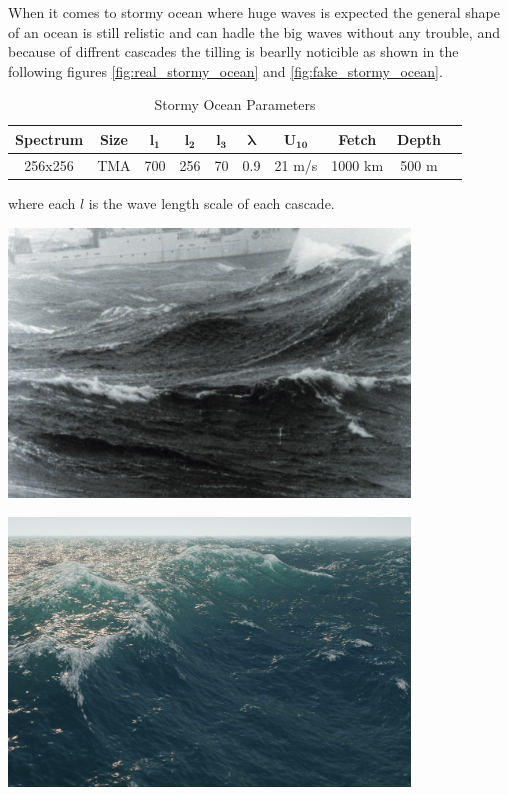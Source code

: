 When it comes to stormy ocean where huge waves is expected the general shape of an ocean is still relistic
and can hadle the big waves without any trouble, and because of diffrent cascades the tilling is bearlly noticible as shown in the following figures \ref{fig:real_stormy_ocean} and \ref{fig:fake_stormy_ocean}.
\begin{table}[h]
    \centering
    \begin{tabular}{|c|c|c|c|c|c|c|c|c|c|}
        \hline
        \textbf{Spectrum} & \textbf{Size} & $\mathbf{l_1}$ & $\mathbf{l_2}$ & $\mathbf{l_3}$ & $\mathbf{\lambda}$ & $\mathbf{U_{10}}$ & \textbf{Fetch} & \textbf{Depth} \\
        \hline
        256x256 & TMA & 700 & 256 & 70 & 0.9 & 21 m/s & 1000 km & 500 m \\
        \hline
    \end{tabular}
    \caption{Stormy Ocean Parameters}
    \label{tab:stormy_ocean}
\end{table}
where each $l$ is the wave length scale of each cascade.

\begin{minipage}{0.48\textwidth}
    \centering
    \includegraphics[width=0.8\textwidth]{"images/real_stormy_ocean.png"}
    \captionsetup{justification=centering}
    \label{fig:real_stormy_ocean}
\end{minipage}
\hfill
\begin{minipage}{0.48\textwidth}
    \centering
    \includegraphics[width=0.8\textwidth]{"images/fake_stormy_ocean.png"}
    \label{fig:fake_stormy_ocean}
\end{minipage}